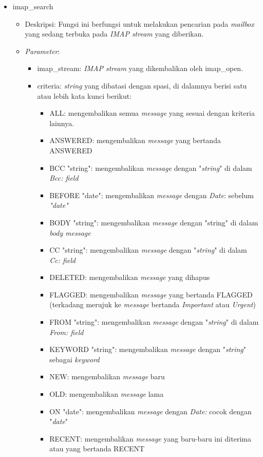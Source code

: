 \begin{itemize}
\item imap\_search
\begin{itemize}
\item Deskripsi: Fungsi ini berfungsi untuk melakukan pencarian pada \textit{mailbox} yang sedang terbuka pada \textit{IMAP stream} yang diberikan.
\item \textit{Parameter}:
\begin{itemize}
\item imap\_stream: \textit{IMAP stream} yang dikembalikan oleh imap\_open.
\item criteria: \textit{string} yang dibatasi dengan spasi, di dalamnya berisi satu atau lebih kata kunci berikut: 
  \begin{itemize}
  \item ALL: mengembalikan semua \textit{message} yang sesuai dengan kriteria lainnya.
  \item ANSWERED: mengembalikan \textit{message} yang bertanda ANSWERED
  \item BCC "string": mengembalikan \textit{message} dengan "\textit{string}" di dalam \textit{Bcc: field}
  \item BEFORE "date": mengembalikan \textit{message} dengan \textit{Date}: sebelum \textit{"date"}
  \item BODY "string": mengembalikan \textit{message} dengan "string" di dalam \textit{body message}
  \item CC "string": mengembalikan \textit{message} dengan "\textit{string}" di dalam \textit{Cc: field}
  \item DELETED: mengembalikan \textit{message} yang dihapus
  \item FLAGGED: mengembalikan \textit{message} yang bertanda FLAGGED (terkadang merujuk ke \textit{message} bertanda \textit{Important} atau \textit{Urgent})
  \item FROM "string": mengembalikan \textit{message} dengan "\textit{string}" di dalam \textit{From: field}
  \item KEYWORD "string": mengembalikan \textit{message} dengan "\textit{string}" sebagai \textit{keyword}
  \item NEW: mengembalikan \textit{message} baru
  \item OLD: mengembalikan \textit{message} lama
  \item ON "date": mengembalikan \textit{message} dengan \textit{Date:} cocok dengan "\textit{date}"
  \item RECENT: mengembalikan \textit{message} yang baru-baru ini diterima atau yang bertanda RECENT

\end{itemize}
\end{itemize}
\end{itemize}
\end{itemize}
